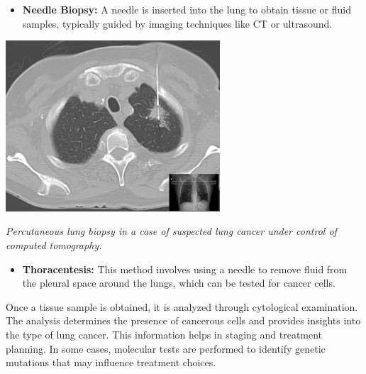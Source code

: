 \begin{itemize}
    \item \textbf{Needle Biopsy:} A needle is inserted into the lung to obtain tissue or fluid 
    samples, typically guided by imaging techniques like CT or ultrasound.
\end{itemize}

\vspace{1em}
\begin{center}
    \includegraphics[width=0.60\textwidth]{../assets/04-diagnosis/lc-needle-biopsy.png}

    \small\textit{Percutaneous lung biopsy in a case of suspected lung cancer under control of 
    computed tomography. \cite{enwiki:1188144138}}
\end{center}
\vspace{1em}

\newpage

\begin{itemize}
    \item \textbf{Thoracentesis:} This method involves using a needle to remove fluid from the 
    pleural space around the lungs, which can be tested for cancer cells.
\end{itemize}

Once a tissue sample is obtained, it is analyzed through cytological examination. The analysis 
determines the presence of cancerous cells and provides insights into the type of lung cancer. This 
information helps in staging and treatment planning. In some cases, molecular tests are performed to 
identify genetic mutations that may influence treatment choices.


